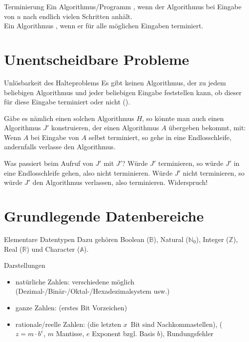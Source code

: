 \begin{Def}{Terminierung}
    Ein Algorithmus/Programm ,
    wenn der Algorithmus bei Eingabe von $u$ nach endlich vielen Schritten
    anhält. \\
    Ein Algorithmus , wenn er für alle möglichen
    Eingaben terminiert.
\end{Def}

\section{%
    Unentscheidbare Probleme%
}

\begin{Satz}{Unlösbarkeit des Halteproblems}
    Es gibt keinen Algorithmus, der zu jedem beliebigen Algorithmus und jeder
    beliebigen Eingabe feststellen kann, ob dieser für diese Eingabe terminiert
    oder nicht ().

    Gäbe es nämlich einen solchen Algorithmus $H$, so könnte man auch einen
    Algorithmus $J'$ konstruieren, der einen Algorithmus $A$ übergeben bekommt,
    mit:
    Wenn $A$ bei Eingabe von $A$ selbst terminiert, so gehe in eine
    Endlosschleife, andernfalls verlasse den Algorithmus.

    Was passiert beim Aufruf von $J'$ mit $J'$? Würde $J'$ terminieren, so
    würde $J'$ in eine Endlosschleife gehen, also nicht terminieren.
    Würde $J'$  nicht terminieren, so würde $J'$ den Algorithmus verlassen,
    also terminieren.
    Widerspruch!
\end{Satz}

\section{%
    Grundlegende Datenbereiche%
}

\begin{Def}{Elementare Datentypen}
    Dazu gehören Boolean ($\mathbb{B}$), Natural ($\mathbb{N}_0$),
    Integer ($\mathbb{Z}$), Real ($\mathbb{R}$) und Character ($\mathbb{A}$).
\end{Def}

\begin{Def}{Darstellungen}
    \begin{itemize}
        \item natürliche Zahlen: verschiedene 
        möglich \\
        (Dezimal-/Binär-/Oktal-/Hexadezimalsystem usw.)

        \item ganze Zahlen: 
        (erstes Bit Vorzeichen)

        \item rationale/reelle Zahlen: 
        (die letzten $x$~Bit sind Nachkommastellen),
        ($z = m \cdot b^e$, $m$ Mantisse, $e$ Exponent bzgl. Basis $b$),
        Rundungsfehler
    \end{itemize}
\end{Def}

